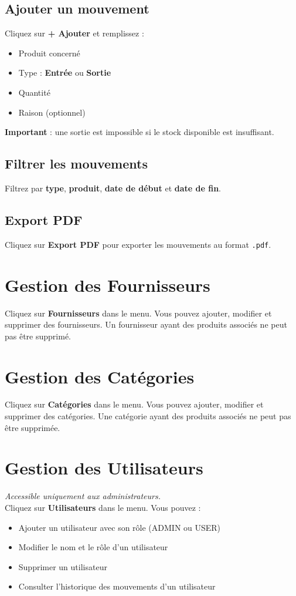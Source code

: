 \documentclass[12pt, a4paper]{article}
\begin{document}
	\subsection{Ajouter un mouvement}
	Cliquez sur \textbf{+ Ajouter} et remplissez :
	\begin{itemize}
		\item Produit concerné
		\item Type : \textbf{Entrée} ou \textbf{Sortie}
		\item Quantité
		\item Raison (optionnel)
	\end{itemize}
	
	\textbf{Important} : une sortie est impossible si le stock disponible est insuffisant.
	
	\subsection{Filtrer les mouvements}
	Filtrez par \textbf{type}, \textbf{produit}, \textbf{date de début} et \textbf{date de fin}.
	
	\subsection{Export PDF}
	Cliquez sur \textbf{Export PDF} pour exporter les mouvements au format \texttt{.pdf}.
	
	\section{Gestion des Fournisseurs}
	Cliquez sur \textbf{Fournisseurs} dans le menu. Vous pouvez ajouter, modifier et supprimer des fournisseurs. Un fournisseur ayant des produits associés ne peut pas être supprimé.
	
	\section{Gestion des Catégories}
	Cliquez sur \textbf{Catégories} dans le menu. Vous pouvez ajouter, modifier et supprimer des catégories. Une catégorie ayant des produits associés ne peut pas être supprimée.
	
	\section{Gestion des Utilisateurs}
	\textit{Accessible uniquement aux administrateurs.}\\[0.3cm]
	Cliquez sur \textbf{Utilisateurs} dans le menu. Vous pouvez :
	\begin{itemize}
		\item Ajouter un utilisateur avec son rôle (ADMIN ou USER)
		\item Modifier le nom et le rôle d'un utilisateur
		\item Supprimer un utilisateur
		\item Consulter l'historique des mouvements d'un utilisateur
	\end{itemize}
	
\end{document}

